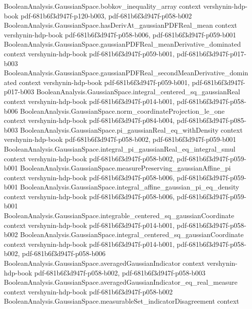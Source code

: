\begin{theorem}
\proofstep
  {BooleanAnalysis.GaussianSpace.bobkov_inequality_array}
  {context}
  {vershynin-hdp-book}
  {pdf-681b6f3d947f-p120-b003,
    pdf-681b6f3d947f-p058-b002}
\proofstep
  {BooleanAnalysis.GaussianSpace.hasDerivAt_gaussianPDFReal_mean}
  {context}
  {vershynin-hdp-book}
  {pdf-681b6f3d947f-p058-b006,
    pdf-681b6f3d947f-p059-b001}
\proofstep
  {BooleanAnalysis.GaussianSpace.gaussianPDFReal_meanDerivative_dominated}
  {context}
  {vershynin-hdp-book}
  {pdf-681b6f3d947f-p059-b001,
    pdf-681b6f3d947f-p017-b003}
\proofstep
  {BooleanAnalysis.GaussianSpace.gaussianPDFReal_secondMeanDerivative_dominated}
  {context}
  {vershynin-hdp-book}
  {pdf-681b6f3d947f-p059-b001,
    pdf-681b6f3d947f-p017-b003}
\proofstep
  {BooleanAnalysis.GaussianSpace.integral_centered_sq_gaussianReal}
  {context}
  {vershynin-hdp-book}
  {pdf-681b6f3d947f-p014-b001,
    pdf-681b6f3d947f-p058-b006}
\proofstep
  {BooleanAnalysis.GaussianSpace.norm_coordinateProjection_le_one}
  {context}
  {vershynin-hdp-book}
  {pdf-681b6f3d947f-p084-b004,
    pdf-681b6f3d947f-p085-b003}
\proofstep
  {BooleanAnalysis.GaussianSpace.pi_gaussianReal_eq_withDensity}
  {context}
  {vershynin-hdp-book}
  {pdf-681b6f3d947f-p058-b002,
    pdf-681b6f3d947f-p059-b001}
\proofstep
  {BooleanAnalysis.GaussianSpace.integral_pi_gaussianReal_eq_integral_smul}
  {context}
  {vershynin-hdp-book}
  {pdf-681b6f3d947f-p058-b002,
    pdf-681b6f3d947f-p059-b001}
\proofstep
  {BooleanAnalysis.GaussianSpace.measurePreserving_gaussianAffine_pi}
  {context}
  {vershynin-hdp-book}
  {pdf-681b6f3d947f-p058-b006,
    pdf-681b6f3d947f-p059-b001}
\proofstep
  {BooleanAnalysis.GaussianSpace.integral_affine_gaussian_pi_eq_density}
  {context}
  {vershynin-hdp-book}
  {pdf-681b6f3d947f-p058-b006,
    pdf-681b6f3d947f-p059-b001}
\proofstep
  {BooleanAnalysis.GaussianSpace.integrable_centered_sq_gaussianCoordinate}
  {context}
  {vershynin-hdp-book}
  {pdf-681b6f3d947f-p014-b001,
    pdf-681b6f3d947f-p058-b002}
\proofstep
  {BooleanAnalysis.GaussianSpace.integral_centered_sq_gaussianCoordinate}
  {context}
  {vershynin-hdp-book}
  {pdf-681b6f3d947f-p014-b001,
    pdf-681b6f3d947f-p058-b002,
    pdf-681b6f3d947f-p058-b006}
\proofstep
  {BooleanAnalysis.GaussianSpace.averagedGaussianIndicator}
  {context}
  {vershynin-hdp-book}
  {pdf-681b6f3d947f-p058-b002,
    pdf-681b6f3d947f-p058-b003}
\proofstep
  {BooleanAnalysis.GaussianSpace.averagedGaussianIndicator_eq_real_measure}
  {context}
  {vershynin-hdp-book}
  {pdf-681b6f3d947f-p058-b002}
\proofstep
  {BooleanAnalysis.GaussianSpace.measurableSet_indicatorDisagreement}
  {context}

\end{theorem}

